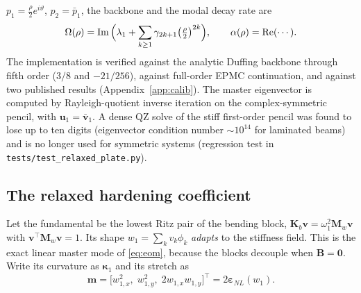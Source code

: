 $p_1=\tfrac\rho2e^{i\vartheta}$, $p_2=\bar p_1$, the backbone and the modal decay rate are
\begin{equation}
\Omega(\rho)=\operatorname{Im}\Big(\lambda_1+\sum_{k\ge1}\gamma_{2k+1}\big(\tfrac{\rho}{2}\big)^{2k}\Big),\qquad
\alpha(\rho)=\operatorname{Re}(\cdots).
\label{eq:backbone}
\end{equation}
The implementation is verified against the analytic Duffing backbone through fifth
order ($3/8$ and $-21/256$), against full-order EPMC continuation, and against two
published results \cite{pozzi2025} (Appendix~\ref{app:calib}). The master
eigenvector is computed by Rayleigh-quotient inverse iteration on the complex-symmetric
pencil, with $\bm u_1=\bar{\bm v}_1$. A dense QZ solve of the stiff first-order pencil was
found to lose up to ten digits (eigenvector condition number $\sim10^{14}$ for laminated
beams) and is no longer used for symmetric systems (regression test in
\texttt{tests/test\_relaxed\_plate.py}).

\subsection{The relaxed hardening coefficient}\label{sec:relaxed}
Let the fundamental be the lowest Ritz pair of the bending block,
$\bm K_b\bm v=\omega_1^2\bm M_w\bm v$ with $\bm v^{\!\top}\bm M_w\bm v=1$. Its shape
$w_1=\sum_kv_k\phi_k$ \emph{adapts} to the stiffness field. This is the exact linear
master mode of \eqref{eq:eom}, because the blocks decouple when $\bm B=\bm0$. Write its
curvature as $\bm\kappa_1$ and its stretch as
\begin{equation}
\bm m=\big[w_{1,x}^2,\;w_{1,y}^2,\;2w_{1,x}w_{1,y}\big]^{\!\top}=2\bm\varepsilon_{NL}(w_1).
\end{equation}

